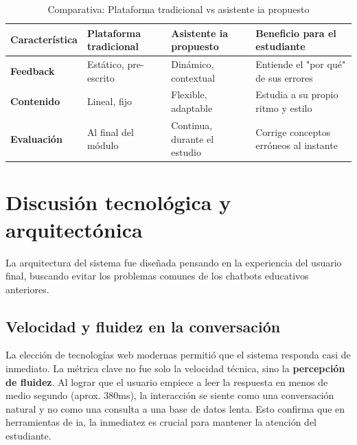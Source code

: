 \begin{table}[H]
\centering
\small
\begin{tabular}{|p{3cm}|p{3.5cm}|p{3.5cm}|p{4cm}|}
\hline
\textbf{Característica} & \textbf{Plataforma tradicional} & \textbf{Asistente \gls{ia} propuesto} & \textbf{Beneficio para el estudiante} \\
\hline
\textbf{Feedback} & Estático, pre-escrito & Dinámico, contextual & Entiende el "por qué" de sus errores \\
\hline
\textbf{Contenido} & Lineal, fijo & Flexible, adaptable & Estudia a su propio ritmo y estilo \\
\hline
\textbf{Evaluación} & Al final del módulo & Continua, durante el estudio & Corrige conceptos erróneos al instante \\
\hline
\end{tabular}
\caption{Comparativa: Plataforma tradicional vs asistente \gls{ia} propuesto}
\label{tabla:lms_vs_ai}
\end{table}

\section{Discusión tecnológica y arquitectónica}

La arquitectura del sistema fue diseñada pensando en la experiencia del usuario final, buscando evitar los problemas comunes de los chatbots educativos anteriores.

\subsection{Velocidad y fluidez en la conversación}
La elección de tecnologías web modernas permitió que el sistema responda casi de inmediato. La métrica clave no fue solo la velocidad técnica, sino la \textbf{percepción de fluidez}. Al lograr que el usuario empiece a leer la respuesta en menos de medio segundo (aprox. 380ms), la interacción se siente como una conversación natural y no como una consulta a una base de datos lenta. Esto confirma que en herramientas de \gls{ia}, la inmediatez es crucial para mantener la atención del estudiante.

